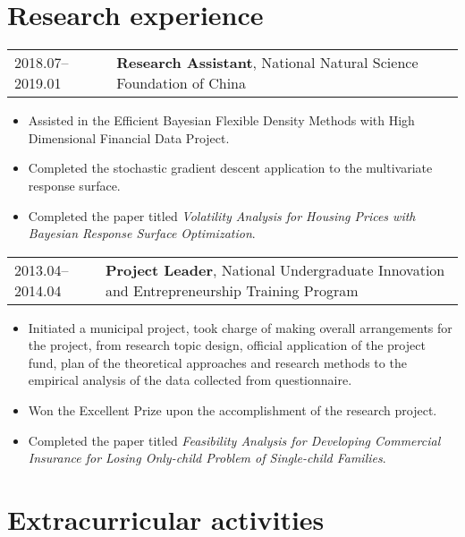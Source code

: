 \documentclass[10pt,a4paper,]{article}
\providecommand{\tightlist}{%
  \setlength{\itemsep}{0pt}\setlength{\parskip}{0pt}}
\begin{document}
\hypertarget{research-experience}{%
\section{Research experience}\label{research-experience}}

\begin{tabular}{ll}
  2018.07--2019.01 & \textbf{Research Assistant}, National Natural Science Foundation of China \\ 
  \end{tabular}

\begin{itemize}
\tightlist
\item
  Assisted in the Efficient Bayesian Flexible Density Methods with High Dimensional Financial Data Project.
\item
  Completed the stochastic gradient descent application to the multivariate response surface.
\item
  Completed the paper titled \emph{Volatility Analysis for Housing Prices with Bayesian Response
  Surface Optimization}.
\end{itemize}

\begin{tabular}{ll}
  2013.04--2014.04 & \textbf{Project Leader}, National Undergraduate Innovation and Entrepreneurship Training Program \\ 
  \end{tabular}

\begin{itemize}
\tightlist
\item
  Initiated a municipal project, took charge of making overall arrangements for the project, from research topic design, official application of the project fund, plan of the theoretical approaches and research methods to the empirical analysis of the data collected from questionnaire.
\item
  Won the Excellent Prize upon the accomplishment of the research project.
\item
  Completed the paper titled \emph{Feasibility Analysis for Developing Commercial Insurance for
  Losing Only-child Problem of Single-child Families}.
\end{itemize}

\hypertarget{extracurricular-activities}{%
\section{Extracurricular activities}\label{extracurricular-activities}}
\end{document}
